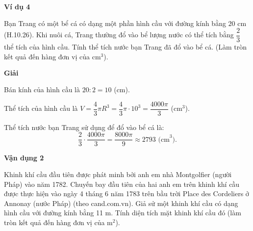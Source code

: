 \begin{lesson}
    \textbf{Ví dụ 4}

    Bạn Trang có một bể cá có dạng một phần hình cầu với đường kính bằng $20$ cm (H.10.26). Khi nuôi cá, Trang thường đổ vào bể lượng nước có thể tích bằng $\dfrac{2}{3}$ thể tích của hình cầu. Tính thể tích nước bạn Trang đã đổ vào bể cá. (Làm tròn kết quả đến hàng đơn vị của cm$^3$).


    \textbf{Giải}

    Bán kính của hình cầu là $20:2=10$ (cm).

    Thể tích của hình cầu là $V=\dfrac{4}{3}\pi R^3=\dfrac{4}{3}\pi\cdot 10^3=\dfrac{4000\pi}{3}$ (cm$^3$).

    Thể tích nước bạn Trang sử dụng để đổ vào bể cá là:
    \[
        \dfrac{2}{3}\cdot\dfrac{4000\pi}{3}=\dfrac{8000\pi}{9}\approx 2793\text{ (cm}^3\text{)}.
    \]

    \textbf{Vận dụng 2}

    Khinh khí cầu đầu tiên được phát minh bởi anh em nhà Montgolfier (người Pháp) vào năm 1782. Chuyến bay đầu tiên của hai anh em trên khinh khí cầu được thực hiện vào ngày 4 tháng 6 năm 1783 trên bầu trời Place des Cordeliers ở Annonay (nước Pháp) (theo cand.com.vn). Giả sử một khinh khí cầu có dạng hình cầu với đường kính bằng 11 m. Tính diện tích mặt khinh khí cầu đó (làm tròn kết quả đến hàng đơn vị của m$^2$).


    \answerline
    \answerline
    \answerline
\end{lesson}

